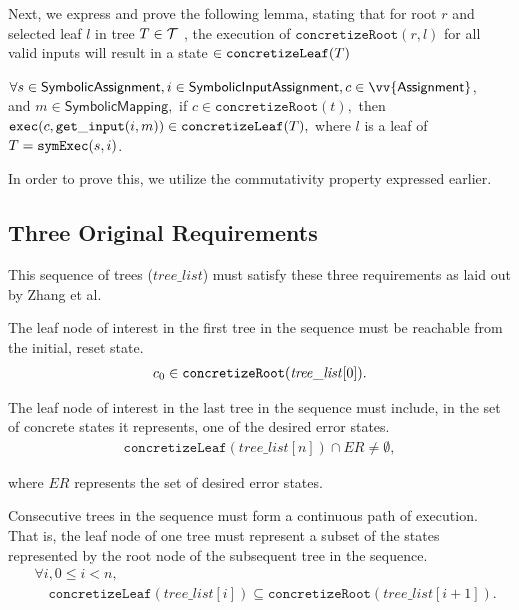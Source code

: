 Next, we express and prove the following lemma, stating that for root $r$ and selected leaf $l$ in tree $T \in \mathcal{T}$ , the execution of $\mathtt{concretizeRoot}(r,l)$ for all valid inputs will result in a state $\in \mathtt{concretizeLeaf}(T)$
\begin{lemma} \label{cop}
$\forall s \in \textsf{SymbolicAssignment}, i \in
  \textsf{SymbolicInputAssignment}, c \in \vv{\textsf{Assignment}}$, \\
  and $m \in \textsf{SymbolicMapping},$
if $c \in \mathtt{concretizeRoot}(t),$
then\\ 
$\mathtt{exec}(c, \mathtt{get\_input} (i, m)) \in \mathtt{concretizeLeaf}(T),$
where $l$ is a leaf of $T =  \mathtt{symExec}(s, i)$.
\end{lemma} 

In order to prove this, we utilize the commutativity property expressed earlier.

\subsection{Three Original Requirements} This sequence of trees ($\mathit{tree\_list}$)
must satisfy these three requirements as laid out by Zhang et al.
\setcounter{property}{0}
\renewcommand{\theproperty}{Z.\arabic{property}}
\begin{property}
  \label{prop:startinit} The leaf node of interest in the first tree in the
  sequence must be reachable from the initial, reset state.
  \begin{align*}
    c_0 \in \mathtt{concretizeRoot}(\mathit{tree\_list}[0]).
  \end{align*}
\end{property}

\begin{property}
  \label{prop:enderror} The leaf node of interest in the last tree in the
  sequence must include, in the set of concrete states it represents, one of the
  desired error states. 
  \begin{align*}
    \mathtt{concretizeLeaf}(\mathit{tree\_list}[n]) \cap \mathit{ER} \neq
    \emptyset,
  \end{align*}
\end{property}
where $\mathit{ER}$ represents the set of desired error states.

\begin{property}
  \label{prop:stitch}
  Consecutive trees in the sequence must form a continuous path of
  execution. That is, the leaf node of one tree must represent a subset of the
  states represented by the root node of the subsequent tree in the sequence.
  \begin{align*}
    &\forall i, 0 \le i < n,\\
    &\quad\mathtt{concretizeLeaf}(\mathit{tree\_list}[i]) \subseteq
\mathtt{concretizeRoot}(\mathit{tree\_list}[i+1]).
\end{align*}

\end{property}

